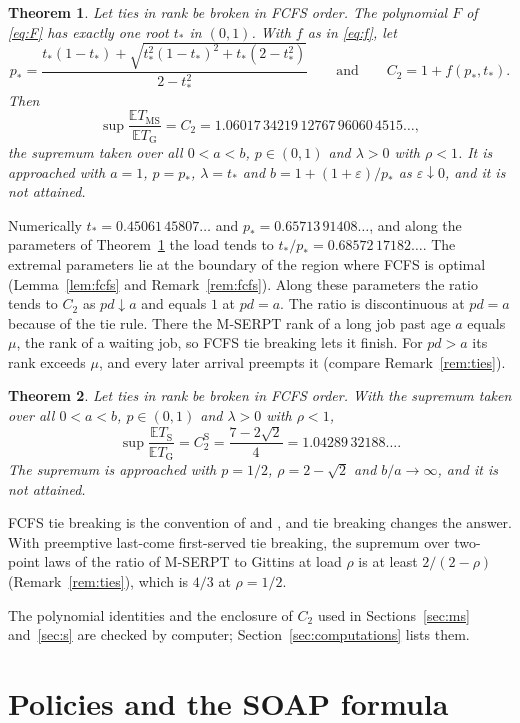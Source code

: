 \documentclass[11pt]{amsart}
\newtheorem{theorem}{Theorem}[section]
\theoremstyle{remark}
\numberwithin{equation}{section}
\newcommand{\E}{\mathbb{E}}
\begin{document}
\begin{theorem}\label{thm:ms}
Let ties in rank be broken in FCFS order. The polynomial $F$ of \eqref{eq:F} has exactly one root $t_*$ in
$(0,1)$. With $f$ as in \eqref{eq:f}, let
\[
p_*=\frac{t_*(1-t_*)+\sqrt{t_*^2(1-t_*)^2+t_*(2-t_*^2)}}{2-t_*^2}
\qquad\text{and}\qquad C_2=1+f(p_*,t_*).
\]
Then
\[
\sup\frac{\E T_{\mathrm{MS}}}{\E T_{\mathrm G}}=C_2
=1.06017\,34219\,12767\,96060\,4515\ldots,
\]
the supremum taken over all $0<a<b$, $p\in(0,1)$ and $\lambda>0$ with
$\rho<1$. It is approached with $a=1$, $p=p_*$, $\lambda=t_*$ and
$b=1+(1+\varepsilon)/p_*$ as $\varepsilon\downarrow0$, and it is not
attained.
\end{theorem}

Numerically $t_*=0.45061\,45807\ldots$ and $p_*=0.65713\,91408\ldots$, and
along the parameters of Theorem~\ref{thm:ms} the load tends to $t_*/p_*=0.68572\,17182\ldots$.
The extremal parameters lie at the
boundary of the region where FCFS is optimal (Lemma~\ref{lem:fcfs} and
Remark~\ref{rem:fcfs}). Along these parameters the ratio tends to $C_2$ as $pd\downarrow a$ and equals $1$ at
$pd=a$. The ratio is discontinuous at $pd=a$ because of the tie rule. There the M-SERPT
rank of a long job past age $a$ equals $\mu$, the rank of a waiting job,
so FCFS tie breaking lets it finish. For $pd>a$ its rank exceeds
$\mu$, and every later arrival preempts it (compare Remark~\ref{rem:ties}).

\begin{theorem}\label{thm:s}
Let ties in rank be broken in FCFS order. With the supremum taken over
all $0<a<b$, $p\in(0,1)$ and $\lambda>0$ with $\rho<1$,
\[
\sup\frac{\E T_{\mathrm S}}{\E T_{\mathrm G}}=C_2^{\mathrm S}=\frac{7-2\sqrt2}{4}
=1.04289\,32188\ldots .
\]
The supremum is approached with $p=1/2$, $\rho=2-\sqrt2$ and
$b/a\to\infty$, and it is not attained.
\end{theorem}

FCFS tie breaking is the convention of \cite[Section~2.2]{SHS18} and
\cite[Section~2.1]{SHS20}, and tie breaking changes the answer. With preemptive last-come
first-served tie breaking, the supremum over two-point laws of the ratio of
M-SERPT to Gittins at load $\rho$ is at least $2/(2-\rho)$
(Remark~\ref{rem:ties}), which is $4/3$ at $\rho=1/2$.

The polynomial identities and the enclosure of $C_2$ used in
Sections~\ref{sec:ms} and~\ref{sec:s} are checked by computer;
Section~\ref{sec:computations} lists them.

\section{Policies and the SOAP formula}\label{sec:model}
\end{document}
